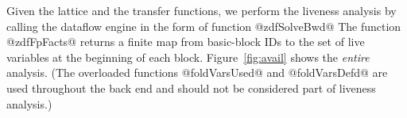 \documentclass[blockstyle,preprint,nocopyrightspace]{sigplanconf}
\newcommand{\authornote}[1]{{\em #1}}
\def\authornote#1{\unskip\relax}
\newcommand{\john}[1]{\authornote{JD: #1}}
\newcommand\figref[1]{Figure~\ref{fig:#1}}
\begin{document}
Given the lattice and the transfer functions,
we perform the liveness analysis by calling
the dataflow engine in the form of function @zdfSolveBwd@
The function @zdfFpFacts@ returns 
a finite map from basic-block IDs to the set of live variables
at the beginning of each block.
\figref{avail} shows the \emph{entire} analysis.
(The overloaded functions
@foldVarsUsed@ and @foldVarsDefd@ are used throughout the back end and
should not be considered part of liveness analysis.)

\end{document}
